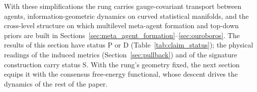 With these simplifications the rung carries gauge-covariant transport between agents, information-geometric dynamics on curved statistical manifolds, and the cross-level structure on which multilevel meta-agent formation and top-down priors are built in Sections~\ref{sec:meta_agent_formation}--\ref{sec:ouroboros}. The results of this section have status P or D (Table~\ref{tab:claim_status}); the physical readings of the induced metrics (Section~\ref{sec:pullback}) and of the signature construction carry status S. With the rung's geometry fixed, the next section equips it with the consensus free-energy functional, whose descent drives the dynamics of the rest of the paper.
